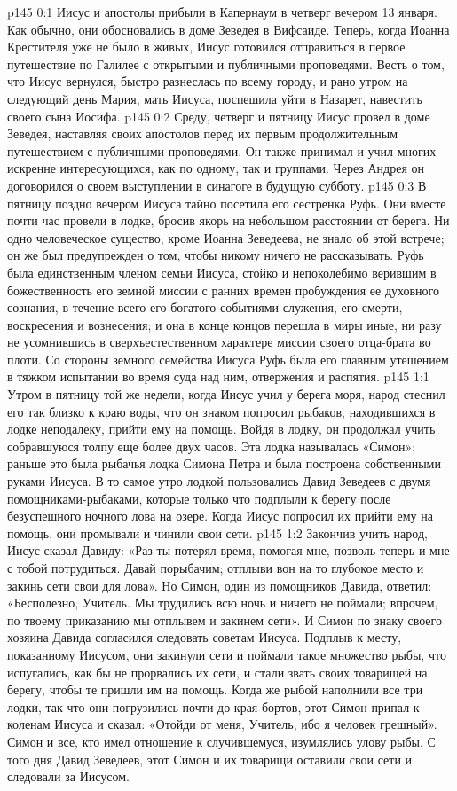 \author{Комиссия срединников}
\vs p145 0:1 Иисус и апостолы прибыли в Капернаум в четверг вечером 13 января. Как обычно, они обосновались в доме Зеведея в Вифсаиде. Теперь, когда Иоанна Крестителя уже не было в живых, Иисус готовился отправиться в первое путешествие по Галилее с открытыми и публичными проповедями. Весть о том, что Иисус вернулся, быстро разнеслась по всему городу, и рано утром на следующий день Мария, мать Иисуса, поспешила уйти в Назарет, навестить своего сына Иосифа.
\vs p145 0:2 Среду, четверг и пятницу Иисус провел в доме Зеведея, наставляя своих апостолов перед их первым продолжительным путешествием с публичными проповедями. Он также принимал и учил многих искренне интересующихся, как по одному, так и группами. Через Андрея он договорился о своем выступлении в синагоге в будущую субботу.
\vs p145 0:3 В пятницу поздно вечером Иисуса тайно посетила его сестренка Руфь. Они вместе почти час провели в лодке, бросив якорь на небольшом расстоянии от берега. Ни одно человеческое существо, кроме Иоанна Зеведеева, не знало об этой встрече; он же был предупрежден о том, чтобы никому ничего не рассказывать. Руфь была единственным членом семьи Иисуса, стойко и непоколебимо верившим в божественность его земной миссии с ранних времен пробуждения ее духовного сознания, в течение всего его богатого событиями служения, его смерти, воскресения и вознесения; и она в конце концов перешла в миры иные, ни разу не усомнившись в сверхъестественном характере миссии своего отца\hyp{}брата во плоти. Со стороны земного семейства Иисуса Руфь была его главным утешением в тяжком испытании во время суда над ним, отвержения и распятия.
\vs p145 1:1 Утром в пятницу той же недели, когда Иисус учил у берега моря, народ стеснил его так близко к краю воды, что он знаком попросил рыбаков, находившихся в лодке неподалеку, прийти ему на помощь. Войдя в лодку, он продолжал учить собравшуюся толпу еще более двух часов. Эта лодка называлась «Симон»; раньше это была рыбачья лодка Симона Петра и была построена собственными руками Иисуса. В то самое утро лодкой пользовались Давид Зеведеев с двумя помощниками\hyp{}рыбаками, которые только что подплыли к берегу после безуспешного ночного лова на озере. Когда Иисус попросил их прийти ему на помощь, они промывали и чинили свои сети.
\vs p145 1:2 Закончив учить народ, Иисус сказал Давиду: «Раз ты потерял время, помогая мне, позволь теперь и мне с тобой потрудиться. Давай порыбачим; отплыви вон на то глубокое место и закинь сети свои для лова». Но Симон, один из помощников Давида, ответил: «Бесполезно, Учитель. Мы трудились всю ночь и ничего не поймали; впрочем, по твоему приказанию мы отплывем и закинем сети». И Симон по знаку своего хозяина Давида согласился следовать советам Иисуса. Подплыв к месту, показанному Иисусом, они закинули сети и поймали такое множество рыбы, что испугались, как бы не прорвались их сети, и стали звать своих товарищей на берегу, чтобы те пришли им на помощь. Когда же рыбой наполнили все три лодки, так что они погрузились почти до края бортов, этот Симон припал к коленам Иисуса и сказал: «Отойди от меня, Учитель, ибо я человек грешный». Симон и все, кто имел отношение к случившемуся, изумлялись улову рыбы. С того дня Давид Зеведеев, этот Симон и их товарищи оставили свои сети и следовали за Иисусом.
